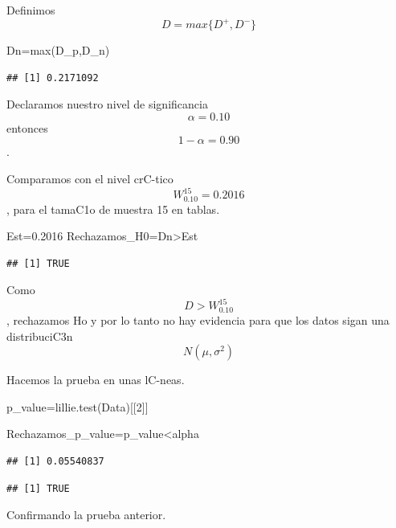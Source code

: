 \documentclass[
]{article}
\newenvironment{Shaded}{\begin{snugshade}}{\end{snugshade}}
\newcommand{\DecValTok}[1]{\textcolor[rgb]{0.00,0.00,0.81}{#1}}
\newcommand{\FloatTok}[1]{\textcolor[rgb]{0.00,0.00,0.81}{#1}}
\newcommand{\FunctionTok}[1]{\textcolor[rgb]{0.00,0.00,0.00}{#1}}
\newcommand{\NormalTok}[1]{#1}
\newcommand{\OtherTok}[1]{\textcolor[rgb]{0.56,0.35,0.01}{#1}}
\newcommand{\SpecialCharTok}[1]{\textcolor[rgb]{0.00,0.00,0.00}{#1}}
\begin{document}
Definimos \[D= max\{ D^{+}, D^{-} \}\]

\begin{Shaded}
\begin{Highlighting}[]
\NormalTok{Dn}\OtherTok{=}\FunctionTok{max}\NormalTok{(D\_p,D\_n)}
\end{Highlighting}
\end{Shaded}

\begin{verbatim}
## [1] 0.2171092
\end{verbatim}

Declaramos nuestro nivel de significancia \[\alpha = 0.10\] entonces
\[1-\alpha = 0.90\].

Comparamos con el nivel crC-tico \[ W_{0.10}^{15}= 0.2016 \], para el
tamaC1o de muestra 15 en tablas.

\begin{Shaded}
\begin{Highlighting}[]
\NormalTok{Est}\OtherTok{=}\FloatTok{0.2016}
\NormalTok{Rechazamos\_H0}\OtherTok{=}\NormalTok{Dn}\SpecialCharTok{\textgreater{}}\NormalTok{Est}
\end{Highlighting}
\end{Shaded}

\begin{verbatim}
## [1] TRUE
\end{verbatim}

Como \[D > W_{0.10}^{15}\], rechazamos Ho y por lo tanto no hay
evidencia para que los datos sigan una distribuciC3n
\[ N(\mu,\sigma^2) \]

Hacemos la prueba en unas lC-neas.

\begin{Shaded}
\begin{Highlighting}[]
\NormalTok{p\_value}\OtherTok{=}\FunctionTok{lillie.test}\NormalTok{(Data)[[}\DecValTok{2}\NormalTok{]]}

\NormalTok{Rechazamos\_p\_value}\OtherTok{=}\NormalTok{p\_value}\SpecialCharTok{\textless{}}\NormalTok{alpha}
\end{Highlighting}
\end{Shaded}

\begin{verbatim}
## [1] 0.05540837
\end{verbatim}

\begin{verbatim}
## [1] TRUE
\end{verbatim}

Confirmando la prueba anterior.
\end{document}
